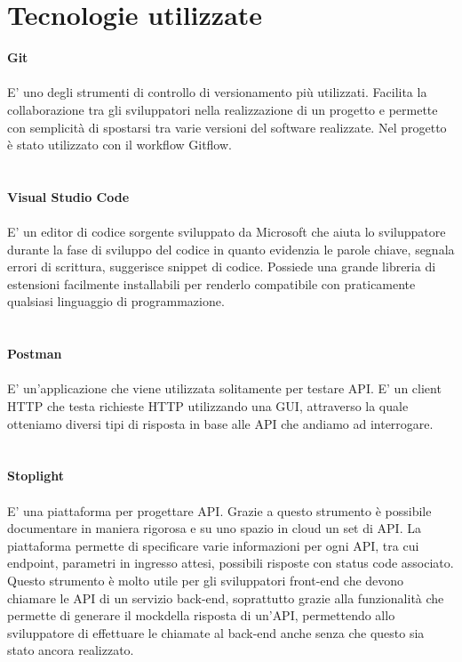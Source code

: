 \section{Tecnologie utilizzate}

\textbf{Git}
\\\\
E' uno degli strumenti di controllo di versionamento più utilizzati. Facilita la collaborazione
tra gli sviluppatori nella realizzazione di un progetto e permette con semplicità di spostarsi
tra varie versioni del software realizzate. Nel progetto è stato utilizzato con il workflow
Gitflow.
\\\\\\
\textbf{Visual Studio Code}
\\\\
E' un editor di codice sorgente sviluppato da Microsoft che aiuta lo sviluppatore durante la fase
di sviluppo del codice in quanto evidenzia le parole chiave, segnala errori di scrittura, suggerisce
snippet di codice. Possiede una grande libreria di estensioni facilmente installabili per renderlo
compatibile con praticamente qualsiasi linguaggio di programmazione.
\\\\\\
\textbf{Postman}
\\\\
E' un'applicazione che viene utilizzata solitamente per testare \gls{API}. E' un client \gls{HTTP} che testa richieste
\gls{HTTP} utilizzando una \gls{GUI}\glsfirstoccur, attraverso la quale otteniamo diversi tipi di risposta in base alle \gls{API} che 
andiamo ad interrogare.
\\\\\\
\textbf{Stoplight}
\\\\
E' una piattaforma per progettare \gls{API}. Grazie a questo strumento è possibile documentare in maniera rigorosa
e su uno spazio in cloud un set di \gls{API}. La piattaforma permette di specificare varie informazioni per ogni
\gls{API}, tra cui \gls{endpoint}\glsfirstoccur, parametri in ingresso attesi, possibili risposte con status code associato. Questo
strumento è molto utile per gli sviluppatori \gls{front-end} che devono chiamare le \gls{API} di un servizio
\gls{back-end}, soprattutto grazie alla funzionalità che permette di generare il \gls{mock}\glsfirstoccur della risposta di un'\gls{API}, 
permettendo allo sviluppatore di effettuare le chiamate al \gls{back-end} anche senza che questo sia stato ancora realizzato.
